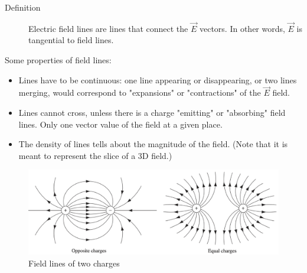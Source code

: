 \documentclass[12pt,a4paper,twoside]{article}
\numberwithin{equation}{section}
\begin{document}
    \begin{description}
        \item[Definition] Electric field lines are lines that connect the $\overrightarrow{E}$ vectors. In other words, $\overrightarrow{E}$ is tangential to field lines.
    \end{description}
    Some properties of field lines:
    \begin{itemize}
        \item Lines have to be continuous: one line appearing or disappearing, or two lines merging, would correspond to "expansions" or "contractions" of the $\overrightarrow{E}$ field.
        \item Lines cannot cross, unless there is a charge "emitting" or "absorbing" field lines. Only one vector value of the field at a given place.
        \item The density of lines tells about the magnitude of the field. (Note that it is meant to represent the slice of a 3D field.)
    \end{itemize}
    \begin{figure}
        \centering
        \includegraphics[width=12cm]{250-Revision/field-lines-eg.png}
        \caption{Field lines of two charges}
        \label{fig:field-line-eg}
    \end{figure}
    
\end{document}

